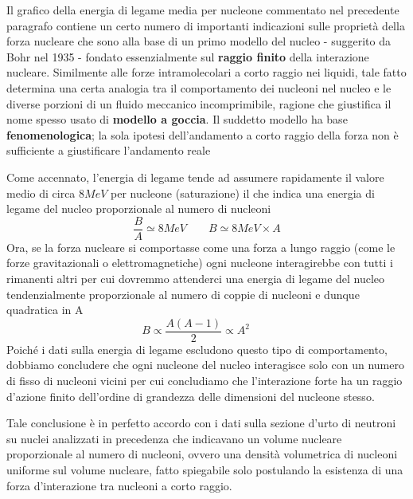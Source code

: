 Il grafico della energia di legame media per nucleone commentato nel
precedente paragrafo contiene un certo numero di importanti indicazioni
sulle proprietà della forza nucleare che sono alla base di un primo
modello del nucleo - suggerito da Bohr nel 1935 - fondato essenzialmente
sul \textbf{raggio finito} della interazione nucleare.
Similmente alle
forze intramolecolari a corto raggio nei liquidi, tale fatto determina
una certa analogia tra il comportamento dei nucleoni nel nucleo e le
diverse porzioni di un fluido meccanico incomprimibile, ragione che
giustifica il nome spesso usato di \textbf{modello a goccia}.
Il
suddetto modello ha base \textbf{fenomenologica}; la sola ipotesi
dell'andamento a corto raggio della forza non è sufficiente a
giustificare l'andamento reale

Come accennato, l'energia di legame tende ad assumere rapidamente il
valore medio di circa \(8MeV\) per nucleone (saturazione) il che indica
una energia di legame del nucleo proporzionale al numero di nucleoni \[
	\frac{B}{A} \simeq 8 MeV \qquad B \simeq 8 MeV \times A
\] Ora, se la forza nucleare si comportasse come una forza a lungo
raggio (come le forze gravitazionali o elettromagnetiche) ogni nucleone
interagirebbe con tutti i rimanenti altri per cui dovremmo attenderci
una energia di legame del nucleo tendenzialmente proporzionale al numero
di coppie di nucleoni e dunque quadratica in A \[
	B \propto \frac{A(A-1)}{2} \propto A^{2} \qquad
\] Poiché i dati sulla energia di legame escludono questo tipo di
comportamento, dobbiamo concludere che ogni nucleone del nucleo
interagisce solo con un numero di fisso di nucleoni vicini per cui
concludiamo che l'interazione forte ha un raggio d'azione finito
dell'ordine di grandezza delle dimensioni del nucleone stesso.

Tale conclusione è in perfetto accordo con i dati sulla sezione d'urto
di neutroni su nuclei analizzati in precedenza che indicavano un volume
nucleare proporzionale al numero di nucleoni, ovvero una densità
volumetrica di nucleoni uniforme sul volume nucleare, fatto spiegabile
solo postulando la esistenza di una forza d'interazione tra nucleoni a
corto raggio.

